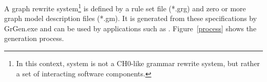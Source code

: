 
A graph rewrite system\footnote{In this context, system is not a CH0-like grammar rewrite system, but rather a set of interacting software components.} is defined by a rule set file (*.grg) and zero or more graph model description files (*.gm). 
It is generated from these specifications by GrGen.exe and can be used by applications such as \GrShell.
Figure~\ref{process} shows the generation process.

